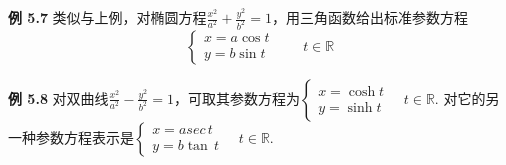 \documentclass{article}
\begin{document}
\vspace{3pt}

\textbf{例 5.7} 类似与上例，对椭圆方程$\displaystyle\frac{x^{2}}{a^{2}}+\frac{y^{2}}{b^{2}}=1$，用三角函数给出标准参数方程\[\left\{\begin{array}{c}
     x=a\cos{t}  \\
     y=b\sin{t}
\end{array}\right.\qquad t\in \mathbb{R}\]

\vspace{3pt}

\textbf{例 5.8} 对双曲线$\displaystyle\frac{x^{2}}{a^{2}}-\frac{y^{2}}{b^{2}}=1$，可取其参数方程为$\left\{\begin{array}{c}
     x=\cosh{t} \\
     y=\sinh{t}
\end{array}\right.\quad t\in\mathbb{R}$. 对它的另一种参数方程表示是$\left\{\begin{array}{c}
     x=a sec\,t  \\
     y=b\tan\,t
\end{array}\right.\quad t\in\mathbb{R}$.

\vspace{4pt}
\end{document}

